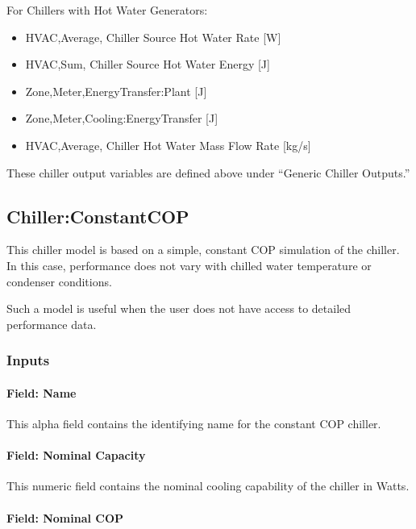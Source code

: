 For Chillers with Hot Water Generators:

\begin{itemize}
\item
  HVAC,Average, Chiller Source Hot Water Rate {[}W{]}
\item
  HVAC,Sum, Chiller Source Hot Water Energy {[}J{]}
\item
  Zone,Meter,EnergyTransfer:Plant {[}J{]}
\item
  Zone,Meter,Cooling:EnergyTransfer {[}J{]}
\item
  HVAC,Average, Chiller Hot Water Mass Flow Rate {[}kg/s{]}
\end{itemize}

These chiller output variables are defined above under ``Generic Chiller Outputs.''

\subsection{Chiller:ConstantCOP}\label{chillerconstantcop}

This chiller model is based on a simple, constant COP simulation of the chiller. In this case, performance does not vary with chilled water temperature or condenser conditions.

Such a model is useful when the user does not have access to detailed performance data.

\subsubsection{Inputs}\label{inputs-2-030}

\paragraph{Field: Name}\label{field-name-2-029}

This alpha field contains the identifying name for the constant COP chiller.

\paragraph{Field: Nominal Capacity}\label{field-nominal-capacity-2-000}

This numeric field contains the nominal cooling capability of the chiller in Watts.

\paragraph{Field: Nominal COP}\label{field-nominal-cop-000}

